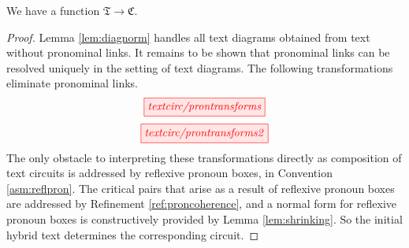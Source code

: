 \begin{proposition}\label{lem:function}  
 We have a function $\mathfrak{T} \rightarrow \mathfrak{C}$.
\begin{proof}
 Lemma \ref{lem:diagnorm} handles all text diagrams obtained from text without pronominal links. It remains to be shown that pronominal links can be resolved uniquely in the setting of text diagrams. The following transformations eliminate pronominal links.
\[
\tikzfig{textcirc/prontransforms}  
\]
\[
\tikzfig{textcirc/prontransforms2}  
\]
The only obstacle to interpreting these transformations directly as composition of text circuits is addressed by reflexive pronoun boxes, in Convention \ref{asm:reflpron}. The critical pairs that arise as a result of reflexive pronoun boxes are addressed by Refinement \ref{ref:proncoherence}, and a normal form for reflexive pronoun boxes is constructively provided by Lemma \ref{lem:shrinking}. So the initial hybrid text determines the corresponding circuit.
\end{proof}
\end{proposition}

